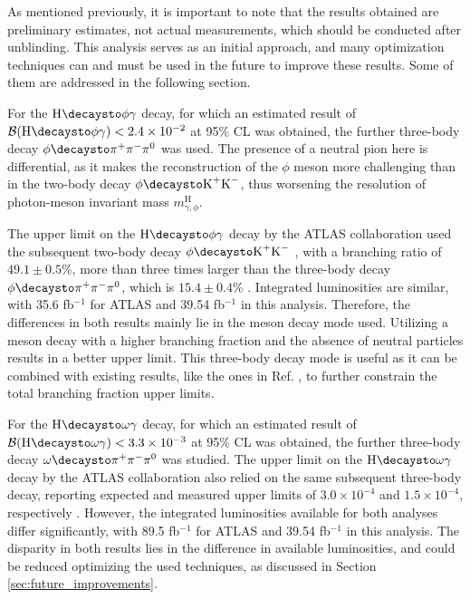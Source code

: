 As mentioned previously, it is important to note that the results obtained are preliminary estimates, not actual measurements, which should be conducted after unblinding. This analysis serves as an initial approach, and many optimization techniques can and must be used in the future to improve these results. Some of them are addressed in the following section.

For the $\text{H}\decaysto \phi\gamma$ decay, for which an estimated result of $\mathcal{B}(\text{H}\decaysto \phi\gamma) < 2.4 \times 10^{-2}$ at 95\% CL was obtained, the further three-body decay $\phi\decaysto \pi^+\pi^-\pi^0$ was used. The presence of a neutral pion here is differential, as it makes the reconstruction of the $\phi$ meson more challenging than in the two-body decay $\phi\decaysto \text{K}^+\text{K}^-$, thus worsening the resolution of photon-meson invariant mass $m^{\text{H}}_{\gamma, \phi}$.

The upper limit on the $\text{H}\decaysto \phi\gamma$ decay by the ATLAS collaboration used the subsequent two-body decay $\phi\decaysto \text{K}^+\text{K}^-$ \cite{ATLAS:2017gko}, with a branching ratio of $49.1\pm0.5$\%, more than three times larger than the three-body decay $\phi\decaysto \pi^+\pi^-\pi^0$, which is $15.4\pm0.4$\% \cite{PDG}. Integrated luminosities are similar, with 35.6 fb$^{-1}$ for ATLAS and 39.54 fb$^{-1}$ in this analysis. Therefore, the differences in both results mainly lie in the meson decay mode used. Utilizing a meson decay with a higher branching fraction and the absence of neutral particles results in a better upper limit. This three-body decay mode is useful as it can be combined with existing results, like the ones in Ref. \cite{ATLAS:2017gko}, to further constrain the total branching fraction upper limits.

For the $\text{H}\decaysto \omega\gamma$ decay, for which an estimated result of $\mathcal{B}(\text{H}\decaysto \omega\gamma) < 3.3 \times 10^{-3}$ at 95\% CL was obtained, the further three-body decay $\omega\decaysto \pi^+\pi^-\pi^0$ was studied. The upper limit on the $\text{H}\decaysto \omega\gamma$ decay by the ATLAS collaboration also relied on the same subsequent three-body decay, reporting expected and measured upper limits of $3.0 \times 10^{-4}$ and $1.5 \times 10^{-4}$, respectively \cite{ATLAS:2023alf}. However, the integrated luminosities available for both analyses differ significantly, with 89.5 fb$^{-1}$ for ATLAS and 39.54 fb$^{-1}$ in this analysis. The disparity in both results lies in the difference in available luminosities, and could be reduced optimizing the used techniques, as discussed in Section \ref{sec:future_improvements}.

